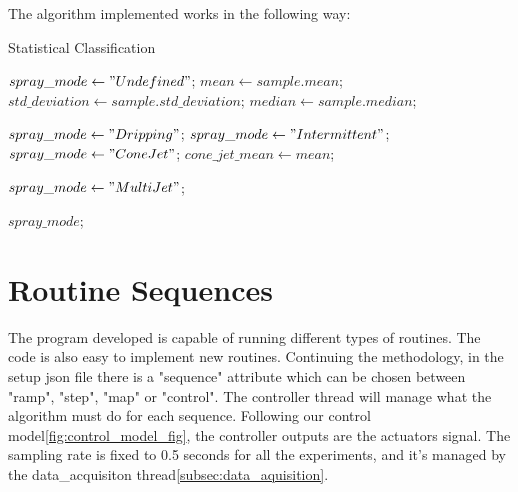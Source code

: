 	The algorithm implemented works in the following way:
	\begin{algorithm}
        \caption{Statistical Classification}\label{alg:statistical_class}
        \begin{algorithmic}

            \State $spray\_mode \gets "Undefined"$;
            \State $mean \gets sample.mean$; 
            \State $std\_deviation \gets sample.std\_deviation$;
            \State $median \gets sample.median$;
            
                \State $spray\_mode \gets "Dripping"$;
                \State $spray\_ mode \gets "Intermittent"$;
                \State $spray\_ mode \gets "Cone Jet"$;
                \State $cone\_jet\_mean \gets mean$;
            \EndIf

            \EndIf

                    \State $spray\_ mode \gets "Multi Jet"$;
                \EndIf
            \EndIf

            \Return $spray\_ mode$;
        \EndFunction
        \end{algorithmic}
    \end{algorithm}



\section{Routine Sequences}
\label{sec:routine_sequences}

    The program developed is capable of running different types of routines. The code is also easy to implement new routines.
    Continuing the methodology, in the setup json file there is a "sequence" attribute which can be chosen between "ramp", "step", "map" or "control".
    The controller thread will manage what the algorithm must do for each sequence.
    Following our control model\ref{fig:control_model_fig}, the controller outputs are the actuators signal.
    The sampling rate is fixed to 0.5 seconds for all the experiments, and it's managed by the data\_acquisiton thread\ref{subsec:data_aquisition}.



